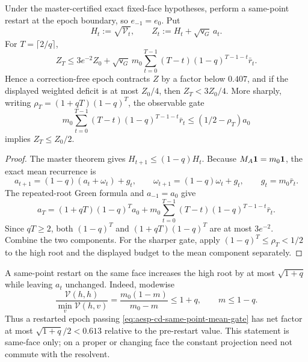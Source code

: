 \begin{proposition}
\label{prop:aesp-cd-master-mean-epoch}
Under the master-certified exact fixed-face hypotheses, perform a same-point
restart at the epoch boundary, so $e_{-1}=e_0$.  Put
\begin{equation*}
 H_t:=\sqrt{\mathcal V_t},\qquad
 Z_t:=H_t+\sqrt{\mathsf v_G}\,a_t.
\end{equation*}
For $T=\lceil2/q\rceil$,
\begin{equation}
 Z_T
 \leq3e^{-2}Z_0
 +\sqrt{\mathsf v_G}\,m_0
  \sum_{t=0}^{T-1}(T-t)(1-q)^{T-1-t}\bar r_t.
 \label{eq:aesp-cd-master-mean-epoch}
\end{equation}
Hence a correction-free epoch contracts $Z$ by a factor below $0.407$, and
if the displayed weighted deficit is at most $Z_0/4$, then
$Z_T<3Z_0/4$.  More sharply, writing
$\rho_T=(1+qT)(1-q)^T$, the observable gate
\begin{equation}
 m_0\sum_{t=0}^{T-1}(T-t)(1-q)^{T-1-t}\bar r_t
 \leq(1/2-\rho_T)a_0
 \label{eq:aesp-cd-same-point-mean-gate}
\end{equation}
implies $Z_T\leq Z_0/2$.
\end{proposition}

\begin{proof}
The master theorem gives $H_{t+1}\leq(1-q)H_t$.  Because
$M_A\mathbf{1}=m_0\mathbf{1}$, the exact mean recurrence is
\begin{equation*}
 a_{t+1}=(1-q)(a_t+\omega_t)+g_t,\qquad
 \omega_{t+1}=(1-q)\omega_t+g_t,\qquad
 g_t=m_0\bar r_t.
\end{equation*}
The repeated-root Green formula and $a_{-1}=a_0$ give
\begin{equation*}
 a_T=(1+qT)(1-q)^Ta_0
 +m_0\sum_{t=0}^{T-1}(T-t)(1-q)^{T-1-t}\bar r_t.
\end{equation*}
Since $qT\geq2$, both $(1-q)^T$ and
$(1+qT)(1-q)^T$ are at most $3e^{-2}$.  Combine the two components.
For the sharper gate, apply $(1-q)^T\leq\rho_T<1/2$ to the high root and
the displayed budget to the mean component separately.
\end{proof}

A same-point restart on the same face increases the high root by at most
$\sqrt{1+q}$ while leaving $a_t$ unchanged.  Indeed, modewise
\begin{equation*}
 \frac{\mathcal V(h,h)}{\min_v\mathcal V(h,v)}
 =\frac{m_0(1-m)}{m_0-m}\leq1+q,
 \qquad m\leq1-q.
\end{equation*}
Thus a restarted epoch passing
\cref{eq:aesp-cd-same-point-mean-gate} has net factor at most
$\sqrt{1+q}/2<0.613$ relative to the pre-restart value.  This statement is
same-face only; on a proper or changing face the constant projection need not
commute with the resolvent.

